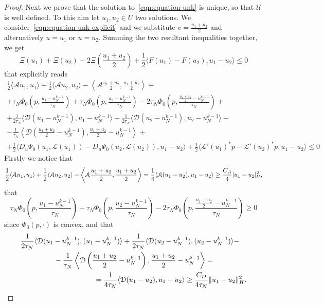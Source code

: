 \documentclass[a4paper,10pt,oneside]{amsbook}
\numberwithin{section}{chapter}
\numberwithin{equation}{chapter}
\theoremstyle{definition}
\DeclarePairedDelimiter{\norm}{\lVert}{\rVert}
\DeclarePairedDelimiter{\dual}{\langle}{\rangle}
\begin{document}
\begin{proof}
Next we prove that the solution to~\eqref{eqn:equation-unk} is unique, so that $\mathcal{U}$ is well defined. To this aim let $u_1,u_2\in U$ two solutions. We consider~\eqref{eqn:equation-unk-explicit} and we substitute $v=\frac{u_1+u_2}{2}$ and alternatively $u=u_1$ or $u=u_2$. Summing the two resultant inequalities together, we get
\begin{equation}
\label{eqn:estimates-unicity}
\Xi(u_1)+\Xi(u_2)-2\Xi\left(\frac{u_1+u_2}{2}\right)+\frac{1}{2}\langle F(u_1)-F(u_2),u_1-u_2\rangle\le0
\end{equation}
that explicitly reads
\[
\begin{multlined}
\frac{1}{2}\langle \mathcal{A}u_1,u_1\rangle+\frac{1}{2}\langle \mathcal{A}u_2,u_2\rangle-\left\langle \mathcal{A}\frac{u_1+u_2}{2},\frac{u_1+u_2}{2}\right\rangle+\\
+\tau_N\Phi_0\left(p,\frac{u_1-u_N^{k-1}}{\tau_N}\right)+\tau_N\Phi_0\left(p,\frac{u_2-u_N^{k-1}}{\tau_N}\right)-2\tau_N\Phi_0\left(p,\frac{\frac{u_1+u_2}{2}-u_N^{k-1}}{\tau_N}\right)+\\
+\frac{1}{2\tau_N}\langle \mathcal{D}(u_1-u_N^{k-1}),u_1-u_N^{k-1}\rangle+\frac{1}{2\tau_N}\langle \mathcal{D}(u_2-u_N^{k-1}),u_2-u_N^{k-1}\rangle-\\
-\frac{1}{\tau_N}\left\langle \mathcal{D}\left(\frac{u_1+u_2}{2}-u_N^{k-1}\right),\frac{u_1+u_2}{2}-u_N^{k-1}\right\rangle+\\
+\frac{1}{2}\langle D_u\Psi_0(u_1,\mathcal{L}(u_1))-D_u\Psi_0(u_2,\mathcal{L}(u_2)),u_1-u_2\rangle+\frac{1}{2}\langle\mathcal{L}'(u_1)^*p-\mathcal{L}'(u_2)^*p,u_1-u_2\rangle\le0
\end{multlined}
\]
Firstly we notice that
\[
\frac{1}{2}\dual{\mathcal{A}u_1,u_1}+\frac{1}{2}\dual{\mathcal{A}u_2,u_2}-\left\langle\mathcal{A}\frac{u_1+u_2}{2},\frac{u_1+u_2}{2}\right\rangle=\frac{1}{4}\dual{\mathcal{A}(u_1-u_2),u_1-u_2}\ge\frac{C_A}{4}|u_1-u_2|_U^2,
\]
that
\[
\tau_N\Phi_0\left(p,\frac{u_1-u_N^{k-1}}{\tau_N}\right)+\tau_N\Phi_0\left(p,\frac{u_2-u_N^{k-1}}{\tau_N}\right)-2\tau_N\Phi_0\left(p,\frac{\frac{u_1+u_2}{2}-u_N^{k-1}}{\tau_N}\right)\ge0
\]
since $\Phi_0(p,\cdot)$ is convex, and that
\[
\begin{multlined}
\frac{1}{2\tau_N}\dual{\mathcal{D}(u_1-u_N^{k-1}),(u_1-u_N^{k-1})}+\frac{1}{2\tau_N}\dual{\mathcal{D}(u_2-u_N^{k-1}),(u_2-u_N^{k-1})}-\\
-\frac{1}{\tau_N}\left\langle\mathcal{D}\left(\frac{u_1+u_2}{2}-u_N^{k-1}\right),\frac{u_1+u_2}{2}-u_N^{k-1}\right\rangle=\\
=\frac{1}{4\tau_N}\dual{\mathcal{D}(u_1-u_2),u_1-u_2}\ge\frac{C_D}{4\tau_N}\norm{u_1-u_2}_H^2.

\end{multlined}\]
\end{proof}
\end{document}
